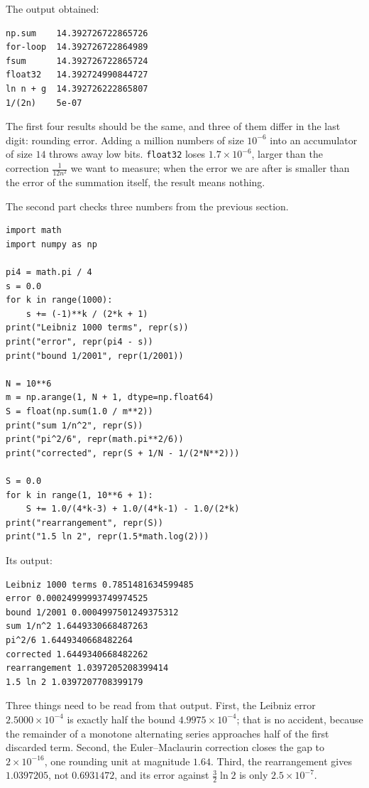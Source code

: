 The output obtained:
\begin{verbatim}
np.sum    14.392726722865726
for-loop  14.392726722864989
fsum      14.392726722865724
float32   14.392724990844727
ln n + g  14.392726222865807
1/(2n)    5e-07
\end{verbatim}

The first four results should be the same, and three of them differ in the last digit:
rounding error. Adding a million numbers of size $10^{-6}$ into an accumulator of size $14$
throws away low bits. \texttt{float32} loses $1.7 \times 10^{-6}$, larger than the
correction $\frac{1}{12n^2}$ we want to measure; when the error we are after is smaller
than the error of the summation itself, the result means nothing.

The second part checks three numbers from the previous section.

\begin{lab}
\begin{verbatim}
import math
import numpy as np

pi4 = math.pi / 4
s = 0.0
for k in range(1000):
    s += (-1)**k / (2*k + 1)
print("Leibniz 1000 terms", repr(s))
print("error", repr(pi4 - s))
print("bound 1/2001", repr(1/2001))

N = 10**6
m = np.arange(1, N + 1, dtype=np.float64)
S = float(np.sum(1.0 / m**2))
print("sum 1/n^2", repr(S))
print("pi^2/6", repr(math.pi**2/6))
print("corrected", repr(S + 1/N - 1/(2*N**2)))

S = 0.0
for k in range(1, 10**6 + 1):
    S += 1.0/(4*k-3) + 1.0/(4*k-1) - 1.0/(2*k)
print("rearrangement", repr(S))
print("1.5 ln 2", repr(1.5*math.log(2)))
\end{verbatim}
\end{lab}

Its output:
\begin{verbatim}
Leibniz 1000 terms 0.7851481634599485
error 0.00024999993749974525
bound 1/2001 0.0004997501249375312
sum 1/n^2 1.6449330668487263
pi^2/6 1.6449340668482264
corrected 1.6449340668482262
rearrangement 1.0397205208399414
1.5 ln 2 1.0397207708399179
\end{verbatim}

Three things need to be read from that output. First, the Leibniz error
$2.5000 \times 10^{-4}$ is exactly half the bound $4.9975 \times 10^{-4}$; that is no
accident, because the remainder of a monotone alternating series approaches half of the
first discarded term. Second, the Euler--Maclaurin correction closes the gap to
$2 \times 10^{-16}$, one rounding unit at magnitude $1.64$. Third, the rearrangement gives
$1.0397205$, not $0.6931472$, and its error against $\tfrac{3}{2}\ln 2$ is only
$2.5 \times 10^{-7}$.

